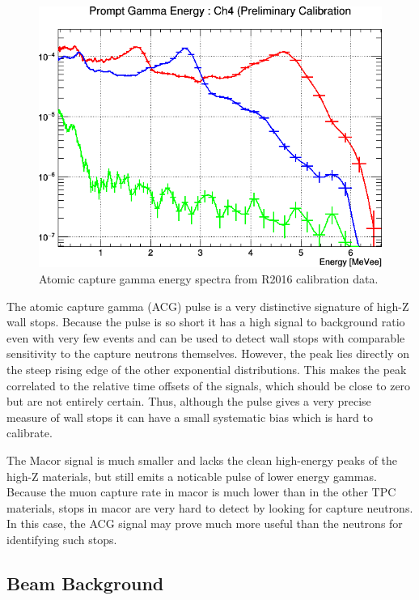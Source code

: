 \begin{figure}[h]
  \includegraphics[width=\textwidth]{neutrons/figures/PromptGamma_EnergiesCh4.png}
  \caption{Atomic capture gamma energy spectra from R2016 calibration data.}
  \label{fig:atomic_lines}
\end{figure}

The atomic capture gamma (ACG) pulse is a very distinctive signature of high-Z wall stops. 
Because the pulse is so short it has a high signal to background ratio even with very few events and can be used to detect wall stops with comparable sensitivity to the capture neutrons themselves.
However, the peak lies directly on the steep rising edge of the other exponential distributions.
This makes the peak correlated to the relative time offsets of the signals, which should be close to zero but are not entirely certain.
Thus, although the pulse gives a very precise measure of wall stops it can have a small systematic bias which is hard to calibrate.

The Macor signal is much smaller and lacks the clean high-energy peaks of the high-Z materials, but still emits a noticable pulse of lower energy gammas.
Because the muon capture rate in macor is much lower than in the other TPC materials, stops in macor are very hard to detect by looking for capture neutrons.
In this case, the ACG signal may prove much more useful than the neutrons for identifying such stops.

\subsection{Beam Background}

